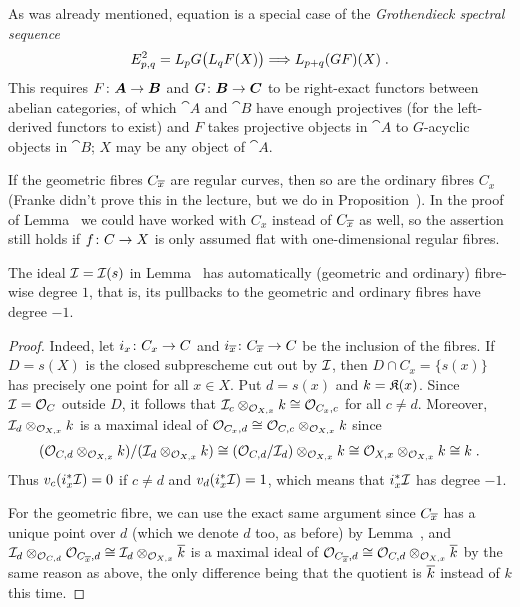 \documentclass[a4paper,parskip=half,numbers=enddot, DIV=12]{scrreprt}
\begin{document}
\begin{rem}
	As was already mentioned, equation  is a special case of the \emph{Grothendieck spectral sequence}
	\begin{align*}
		E_{p,q}^2=L_pG\big(L_qF(X)\big)\converge L_{p+q}(GF)(X)\;.
	\end{align*}
	This requires $F\colon \cat A\morphism \cat B$ and $G\colon \cat B\morphism\cat C$ to be right-exact functors between abelian categories, of which $\cat A$ and $\cat B$ have enough projectives (for the left-derived functors to exist) and $F$ takes projective objects in $\cat A$ to $G$-acyclic objects in $\cat B$; $X$ may be any object of $\cat A$.
\end{rem}
\begin{rem}
	If the geometric fibres $C_{\overline{x}}$ are regular curves, then so are the ordinary fibres $C_x$ (Franke didn't prove this in the lecture, but we do in Proposition~). In the proof of Lemma~ we could have worked with $C_x$ instead of $C_{\overline{x}}$ as well, so the assertion still holds if $f\colon C\morphism X$ is only assumed flat with one-dimensional regular fibres.
\end{rem}
\begin{lem}
	The ideal $\mathcal{I}=\mathcal{I}(s)$ in Lemma~ has automatically (geometric and ordinary) fibre-wise degree $1$, that is, its pullbacks to the geometric and ordinary fibres have degree $-1$.
\end{lem}
\begin{proof}
	Indeed, let $i_x\colon C_x\morphism C$ and $i_{\ov{x}}\colon C_{\ov{x}}\morphism C$ be the inclusion of the fibres. If $D=s(X)$ is the closed subprescheme cut out by $\mathcal{I}$, then $D\cap C_x=\{s(x)\}$ has precisely one point for all $x\in X$. Put $d=s(x)$ and $k=\mathfrak{K}(x)$. Since $\mathcal{I}=\mathcal{O}_C$ outside $D$, it follows that $\mathcal{I}_c\otimes_{\mathcal{O}_{X,x}}k\cong \mathcal{O}_{C_x,c}$ for all $c\neq d$. Moreover, $\mathcal{I}_d\otimes_{\mathcal{O}_{X,x}}k$ is a maximal ideal of $\mathcal{O}_{C_x,d}\cong \mathcal{O}_{C,c}\otimes_{\mathcal{O}_{X,x}}k$ since
	\begin{align*}
		(\mathcal{O}_{C,d}\otimes_{\mathcal{O}_{X,x}}k)/(\mathcal{I}_d\otimes_{\mathcal{O}_{X,x}}k)\cong (\mathcal{O}_{C,d}/\mathcal{I}_d)\otimes_{\mathcal{O}_{X,x}}k\cong \mathcal{O}_{X,x}\otimes_{\mathcal{O}_{X,x}}k\cong k\;.
	\end{align*}
	Thus $v_c(i_x^*\mathcal{I})=0$ if $c\neq d$ and $v_d(i_x^*\mathcal{I})=1$, which means that $i_x^*\mathcal{I}$ has degree $-1$.
	
	For the geometric fibre, we can use the exact same argument since $C_{\overline{x}}$ has a unique point over $d$ (which we denote $d$ too, as before) by Lemma~, and $\mathcal{I}_d\otimes_{\mathcal{O}_{C,d}}\mathcal{O}_{C_{\overline{x}},d}\cong \mathcal{I}_d\otimes_{\mathcal{O}_{X,x}}\overline{k}$ is a maximal ideal of $\mathcal{O}_{C_{\overline{x}},d}\cong \mathcal{O}_{C,d}\otimes_{\mathcal{O}_{X,x}}\overline{k}$ by the same reason as above, the only difference being that the quotient is $\overline{k}$ instead of $k$ this time.
\end{proof}
\end{document}
